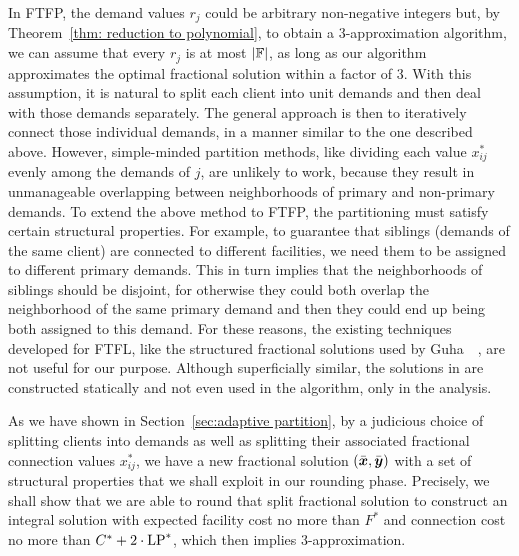 \documentclass[11pt]{article}
\begin{document}
\smallskip

In FTFP, the demand values $r_j$ could be arbitrary
non-negative integers but, by Theorem~\ref{thm: reduction to
  polynomial}, to obtain a $3$-approximation algorithm, we
can assume that every $r_j$ is at most $|\mathbb{F}|$, as
long as our algorithm approximates the optimal fractional
solution within a factor of $3$.  With this assumption, it
is natural to split each client into unit demands and then
deal with those demands separately.  The general approach is
then to iteratively connect those individual demands, in a
manner similar to the one described above. However,
simple-minded partition methods, like dividing each value
$x^\ast_{ij}$ evenly among the demands of $j$, are unlikely
to work, because they result in unmanageable overlapping
between neighborhoods of primary and non-primary demands.
To extend the above method to FTFP, the partitioning must
satisfy certain structural properties. For example, to
guarantee that siblings (demands of the same client) are
connected to different facilities, we need them to be
assigned to different primary demands. This in turn implies
that the neighborhoods of siblings should be disjoint, for
otherwise they could both overlap the neighborhood of the
same primary demand and then they could end up being both
assigned to this demand. For these reasons, the existing
techniques developed for FTFL, like the structured fractional solutions
used by Guha~{\etal}~\cite{GuhaMM01}, are not useful for our
purpose. Although superficially similar, the solutions in
\cite{GuhaMM01} are constructed statically and not even used in the
algorithm, only in the analysis. 

As we have shown in Section~{\ref{sec:adaptive partition}},
by a judicious choice of splitting clients into demands as
well as splitting their associated fractional connection
values $x_{ij}^\ast$, we have a new fractional solution
$(\bar{\boldsymbol{x}},\bar{\boldsymbol{y}})$ with a set of structural properties that
we shall exploit in our rounding phase. Precisely, we shall
show that we are able to round that split fractional
solution to construct an integral solution with expected
facility cost no more than $F^\ast$ and connection cost no
more than $C^\ast+2\cdot\mbox{\rm LP}^\ast$, which then implies
$3$-approximation. 

\end{document}
